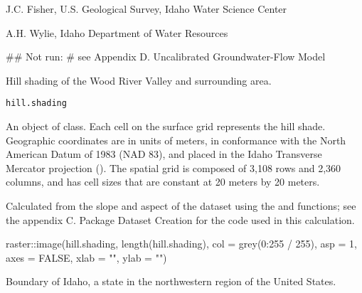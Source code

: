 \documentclass[a4paper]{book}
\begin{document}
%
\begin{Author}\relax
J.C. Fisher, U.S. Geological Survey, Idaho Water Science Center

A.H. Wylie, Idaho Department of Water Resources
\end{Author}
%
\begin{Examples}
\begin{ExampleCode}
## Not run: # see Appendix D. Uncalibrated Groundwater-Flow Model

\end{ExampleCode}
\end{Examples}
%
\begin{Description}\relax
Hill shading of the Wood River Valley and surrounding area.
\end{Description}
%
\begin{Usage}
\begin{verbatim}
hill.shading
\end{verbatim}
\end{Usage}
%
\begin{Format}
An object of  class.
Each cell on the surface grid represents the hill shade.
Geographic coordinates are in units of meters, in conformance with the
North American Datum of 1983 (NAD 83), and placed in the
Idaho Transverse Mercator projection ().
The spatial grid is composed of 3,108 rows and 2,360 columns,
and has cell sizes that are constant at 20 meters by 20 meters.
\end{Format}
%
\begin{Source}\relax
Calculated from the slope and aspect of the  dataset
using the  and  functions;
see the appendix C. Package Dataset Creation for the \R{} code used in this calculation.
\end{Source}
%
\begin{Examples}
\begin{ExampleCode}
raster::image(hill.shading, length(hill.shading), col = grey(0:255 / 255), asp = 1,
              axes = FALSE, xlab = "", ylab = "")

\end{ExampleCode}
\end{Examples}
%
\begin{Description}\relax
Boundary of Idaho, a state in the northwestern region of the United States.
\end{Description}
\end{document}
